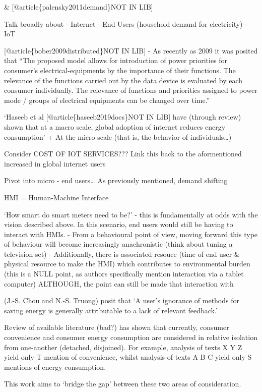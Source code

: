 \documentclass[11pt]{article}
\begin{document}
\& {[}@article\{palensky2011demand\}NOT IN LIB{]}

Talk broadly about - Internet - End Users (household demand for
electricity) - IoT

{[}@article\{bober2009distributed\}NOT IN LIB{]} - As recently as 2009
it was posited that ``The proposed model allows for introduction of
power priorities for consumer's electrical-equipments by the importance
of their functions. The relevance of the functions carried out by the
data device is evaluated by each consumer individually. The relevance of
functions and priorities assigned to power mode / groups of electrical
equipments can be changed over time.''

`Haseeb et al {[}@article\{haseeb2019does\}NOT IN LIB{]} have (through
review) shown that at a macro scale, global adoption of internet reduces
energy consumption' + At the micro scale (that is, the behavior of
individuals\ldots)

Consider COST OF IOT SERVICES??? Link this back to the aformentioned
increased in global internet users

Pivot into micro - end users\ldots{} As previously mentioned, demand
shifting

HMI = Human-Machine Interface

`How smart do smart meters need to be?' - this is fundamentally at odds
with the vision described above. In this scenario, end users would still
be having to interact with HMIs. - From a behavioural point of view,
moving forward this type of behaviour will become increasingly
anachronistic (think about tuning a television set) - Additionally,
there is associated resouce (time of end user \& physical resource to
make the HMI) which contributes to environmental burden (this is a NULL
point, as authors specifically mention interaction via a tablet
computer) ALTHOUGH, the point can still be made that interaction with

(J.-S. Chou and N.-S. Truong) posit that `A user's ignorance of methods
for saving energy is generally attributable to a lack of relevant
feedback.'

Review of available literature (bad?) has shown that currently, consumer
convenience and consumer energy consumption are considered in relative
isolation from one-another (detached, disjoined). For example, analysis
of texts X Y Z yield only T mention of convenience, whilst analysis of
texts A B C yield only S mentions of energy consumption.

This work aims to `bridge the gap' between these two areas of
consideration.
\end{document}

